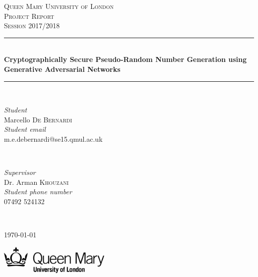 \documentclass[12pt, titlepage]{report}
\theoremstyle{definition}
\begin{document}
\begin{titlepage}
	\newcommand{\HRule}{\rule{\linewidth}{0.5mm}}
	\center
	

	\textsc{\Large Queen Mary University of London}\\[1.5cm]
	\textsc{\Large Project Report}\\[0.5cm]
	\textsc{\large Session 2017/2018}\\[0.cm]


	\HRule\\[0.4cm]

	{\huge\bfseries Cryptographically Secure Pseudo-Random Number Generation using Generative Adversarial Networks}\\[0.1cm]

	\HRule\\[1.5cm]


	\begin{minipage}{0.4\textwidth}
		\begin{flushleft}
			\large
			\textit{Student}\\
			Marcello \textsc{De Bernardi}\\[0.4cm] %
      \textit{Student email}\\
      m.e.debernardi@se15.qmul.ac.uk
		\end{flushleft}
	\end{minipage}
	~
	\begin{minipage}{0.4\textwidth}
		\begin{flushright}
			\large
			\textit{Supervisor}\\
			Dr. Arman \textsc{Khouzani}\\[0.4cm] %
      \textit{Student phone number}\\
      07492 524132
		\end{flushright}
	\end{minipage}
  	~


	\vfill\vfill\vfill
	{\large\today}


	\vfill\vfill
	\includegraphics[width=0.4\textwidth]{img/qmul.jpg}\\[1cm]
	\vfill
\end{titlepage}
\end{document}
